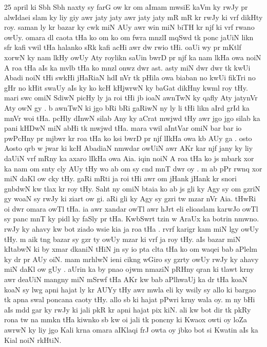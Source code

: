 \documentclass[a4paper]{article}
\begin{document}
25 april ki Sbh Sbh naxty sy farG ow kr om aImam mwsiE kaVm ky rwJy pr alwIdaei slam ky liy giy awr jaty jaty awr jaty jaty mR mR kr  rwJy ki vrf dikHty roy.
saman ly kr bazar ky cwk miN AUy awr win miN biTH  kr njf ki vrf rwano owUy.
omara dl caota tHa ko om ko om fwra mnzlI mqSwd tk ponc jaUiN likn sfr kafi vwil tHa halanko sRk kafi acHi awr dw rwio tHi.
oaUi wy  pr mKtlf xorwN ky nam lkHy owUy Aty roylikn saUin bwrD pr njf ka nam lkHa owa noiN A roa tHa aIs ka mvlb tHa ko mnzl onwz dwr ast.
asty miN dwr dwr tk kwUi Abadi noiN tHi swkHi jHaRiaN hdI nVr tk pHila owa biaban no kwUi fikTri no gHr no kHit swaUy aIs ky ko kcH kHjwrwN ky baGat dikHny kwml roy tHy.
mari swc omiN SdiwN picHy ly ja roi tHi jb ioaN awnTwN ky qafly Aty jatynVr Aty owN gy .
b awnTwN ki jgo bRi bRi gaRiwN ny ly li tHi likn aIrd grId ka mnVr woi tHa.
pcHly dInwN silab Any ky aCrat mwjwd tHy awr jgo jgo silab ka pani kHDwN miN abHi tk mwjwd tHa.
mara vwil aIntVar omiN bar bar io pwPcHny pr mjbwr kr roa tHa ko ksi bwrD pr njf lIkHa owa kb AUy ga .
osto Aosto qrb w jwar ki kcH AbadiaN nmwdar owUiN awr AKr kar  njf jany ky liy daUiN vrf mRny ka axaro lIkHa owa  Aia.
iqin noiN A roa tHa ko js mbark xor ka nam om snty cly AUy tHy wo ab om sy cnd mnT dwr oy .
m ab pPr rwnq xor miN daKl ow cky tHy.
gaRi mRti ja roi tHi awr om jHank jHank kr snori gnbdwN kw tlax kr roy tHy.
Saht ny omiN btaia ko ab js gli ky Agy sy om gzriN gy woaN sy rwJy ki ziart ow gi.
aRi  gli ky Agy sy gzri tw  mzar nVr Aia.
tHwRi oi dwr omara owTl tHa.
ia  awr xandar owTl awr hJrt eli elioaslam karwJo owTl sy panc mnT  ky pidl ky faSly pr tHa.
KwbSwrt tzin w AraUx ka botrin nmwno.
rwJy ky ahavy kw bot ziado wsie kia ja roa tHa .
rvrf karigr kam miN lgy owUy tHy.
m aik tng bazar sy gzr ty owUy mzar ki vrf ja roy tHy.
aIs bazar miN kItabwN ki by xmar dkaniN tHiN jn sy io pta clta tHa  ko om            waqei bab aPlelm ky dr pr AUy oiN.
mam mrhlwN ieni cikng wGiro sy gzrty owUy rwJy ky ahavy miN daKl ow gUy .
aUrin ka by pnao ojwm nmaziN pRHny qran ki tlawt krny awr deaUiN mangny miN mSrwf tHa AKr kw bab aPlhwaUj ka dr tHa koaN koaN sy lwg apni hajat ly kr AUYy tHy awr mwla eli ky wsily sy allo ki bargao tk apna swal poncana caoty tHy.
allo sb ki hajat pPwri krny wala oy.
m ny bHi aIs mdd gar ky rwJy ki jali pkR kr apni hajat pix kiN.
ali kw bot dir tk pkRy rona tw na mmkn tHa kiwnko sb kw oi jali tk poncny ki Kwaox owti oy loZa awrwN ky liy jgo Kali krna omara  aIKlaqi frJ owta oy jbko bot si Kwatin aIs ka Kial noiN rkHtiN.
\end{document}
